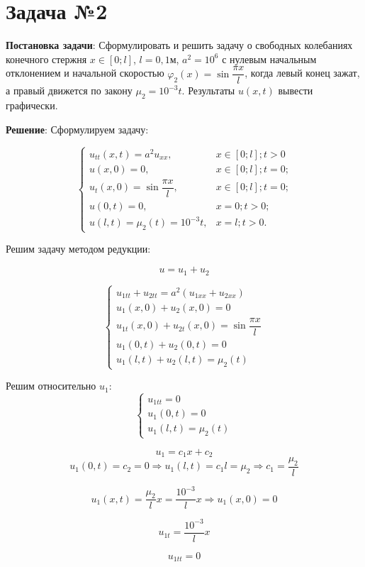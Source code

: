 \section{Задача №2}
\textbf{Постановка задачи}:
Сформулировать и решить задачу о свободных колебаниях конечного стержня $x\in[0;l]$, $l = 0,1$м, $a^{2} = 10^{6}$ с нулевым начальным отклонением и начальной скоростью $\varphi_{2}(x) = \sin{\dfrac{\pi x}{l}}$, когда левый конец зажат, а правый движется по закону $\mu_{2} = 10^{-3}t$. Результаты $u(x, t)$ вывести графически.

\textbf{Решение}:
Сформулируем задачу:

$$
\begin{cases}
u_{tt}(x, t) = a^{2}u_{xx},&\text{$x\in[0;l]; t > 0$}\\
u(x, 0) = 0,&\text{$x\in[0;l]; t = 0$;}\\
u_{t}(x, 0) = \sin{\dfrac{\pi x}{l}},&\text{$x\in[0;l]; t = 0$;}\\
u(0, t) = 0,&\text{$x=0; t > 0$;}\\
u(l, t) = \mu_{2}(t) = 10^{-3}t,&\text{$x=l; t > 0$.}
\end{cases}
$$

Решим задачу методом редукции:

$$ u = u_{1} + u_{2}$$

$$
\begin{cases}
u_{1tt} + u_{2tt} = a^{2}(u_{1xx} + u_{2xx})\\
u_{1}(x, 0) + u_{2}(x, 0) = 0\\
u_{1t}(x, 0) + u_{2t}(x, 0) = \sin{\dfrac{\pi x}{l}}\\
u_{1}(0, t) + u_{2}(0, t) = 0\\
u_{1}(l, t) + u_{2}(l, t) = \mu_{2}(t)
\end{cases}
$$

Решим относительно $u_{1}$:
$$
\begin{cases}
u_{1tt} = 0\\
u_{1}(0, t) = 0\\
u_{1}(l, t) = \mu_{2}(t)
\end{cases}
$$

$$ u_{1} = c_{1}x + c_{2}$$
$$ u_{1}(0, t)  = c_{2} = 0 \Rightarrow u_{1}(l, t) = c_{1}l = \mu_{2} \Rightarrow c_{1} = \dfrac{\mu_{2}}{l}$$

$$ u_{1}(x, t) = \dfrac{\mu_{2}}{l} x = \dfrac{10^{-3}}{l} x \Rightarrow u_{1}(x, 0) = 0$$

$$ u_{1t} = \dfrac{10^{-3}}{l} x$$

$$ u_{1tt} = 0$$

